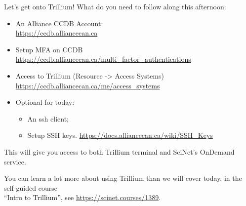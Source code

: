 \documentclass[
  10pt,
  ignorenonframetext,
  aspectratio=169]{beamer}
\providecommand{\tightlist}{%
  \setlength{\itemsep}{0pt}\setlength{\parskip}{0pt}}
\begin{document}
\begin{frame}{Let's get onto Trillium!}
\label{lets-get-onto-trillium}
What do you need to follow along this afternoon:

\begin{itemize}
\item
  An Alliance CCDB Account:\\
  \alert{\url{https://ccdb.alliancecan.ca}}

  \pause
\item
  Setup MFA on CCDB\\
  \alert{\url{https://ccdb.alliancecan.ca/multi_factor_authentications}}

  \pause
\item
  Access to Trillium (Resource -\textgreater{} Access Systems)\\
  \alert{\url{https://ccdb.alliancecan.ca/me/access_systems}}

  \pause
\item
  Optional for today:

  \begin{itemize}
  \tightlist
  \item
    An ssh client;
  \item
    Setup SSH keys. \alert{\url{https://docs.alliancecan.ca/wiki/SSH_Keys}}
  \end{itemize}
\end{itemize}

\pause

This will give you access to both Trillium terminal and SciNet's OnDemand service.

\pause

You can learn a lot more about using Trillium than we will cover today, in the self-guided course\\
``Intro to Trillium'', see \alert{\url{https://scinet.courses/1389}}.
\end{frame}
\end{document}
